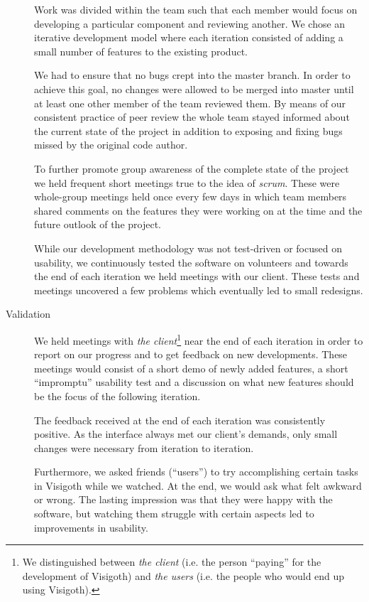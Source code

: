 \documentclass[a4paper,11pt]{article}
\begin{document}
\begin{description}
  Work was divided within the team such that each member would focus
  on developing a particular component and reviewing another. We chose
  an iterative development model where each iteration consisted of
  adding a small number of features to the existing product.

  We had to ensure that no bugs crept into the master branch. In order
  to achieve this goal, no changes were allowed to be merged into
  master until at least one other member of the team reviewed them.
  By means of our consistent practice of peer review the whole team
  stayed informed about the current state of the project in addition
  to exposing and fixing bugs missed by the original code author.

  To further promote group awareness of the complete state of the
  project we held frequent short meetings true to the idea of
  \emph{scrum}. These were whole-group meetings held once every few
  days in which team members shared comments on the features they
  were working on at the time and the future outlook of the project.

  While our development methodology was not test-driven or focused on
  usability, we continuously tested the software on volunteers and
  towards the end of each iteration we held meetings with our client.
  These tests and meetings uncovered a few problems which eventually
  led to small redesigns.

\item[Validation]

  We held meetings with \emph{the client}\footnote{We distinguished
    between \emph{the client} (i.e.  the person ``paying'' for the
    development of Visigoth) and \emph{the users} (i.e. the people who
    would end up using Visigoth).} near the end of each iteration in
  order to report on our progress and to get feedback on new
  developments. These meetings would consist of a short demo of newly
  added features, a short ``impromptu'' usability test and a
  discussion on what new features should be the focus of the following
  iteration.

  The feedback received at the end of each iteration was consistently
  positive. As the interface always met our client's demands, only
  small changes were necessary from iteration to iteration.

  Furthermore, we asked friends (``users'') to try accomplishing
  certain tasks in Visigoth while we watched. At the end, we would ask
  what felt awkward or wrong. The lasting impression was that they
  were happy with the software, but watching them struggle with
  certain aspects led to improvements in usability.


\end{description}
\end{document}
